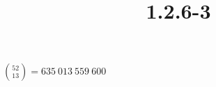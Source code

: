 \documentclass{article}
\title{1.2.6-3}
\begin{document}
\maketitle

\( \binom{52}{13} = 635\ 013\ 559\ 600 \)
\end{document}
